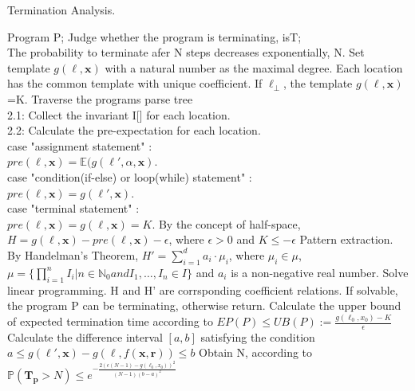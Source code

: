 \documentclass[sigconf,review, anonymous]{acmart}
\begin{document}
\begin{algorithm}[htb]  
	\caption{Termination Analysis.}  
	\label{TA}  
	\begin{algorithmic}[1]  
		\REQUIRE 
		Program P; 
		\ENSURE  
		Judge whether the program is terminating, isT;\\
		The probability to terminate afer N steps decreases exponentially, N.
		\STATE Set template $g(\ell,\boldsymbol{x})$ with a natural number as the maximal degree. Each location has the common template with unique coefficient. If $\ell_{\bot}$, the template $g(\ell,\boldsymbol{x})$=K.
		\STATE Traverse the programs parse tree \\
		2.1: Collect the invariant I[] for each location.\\
		2.2: Calculate the pre-expectation for each location.\\
		\quad \quad case "assignment statement" :\\
		\quad \quad \quad \quad $pre(\ell,\boldsymbol{x})= \mathbb{E}(g(\ell',\alpha,\boldsymbol{x})$.\\
		\quad \quad case "condition(if-else) or loop(while) statement" :\\
		\quad \quad \quad \quad $pre(\ell,\boldsymbol{x})=g(\ell',\boldsymbol{x})$.\\
		\quad \quad case "terminal statement" :\\
		\quad \quad \quad \quad $pre(\ell,\boldsymbol{x})=g(\ell,\boldsymbol{x})=K$.
		\STATE By the concept of half-space, $H=g(\ell,\boldsymbol{x})-pre(\ell,\boldsymbol{x})-\epsilon$, where $\epsilon >0$ and $K \leq -\epsilon$
		\STATE Pattern extraction. By Handelman's Theorem, $H'=\sum\limits_{i=1}^{d} a_i\cdot \mu_i$, where $\mu_i \in \mu$, $\mu=\{\prod\limits_{i=1}^{n} I_i | n\in\mathbb{N}_0 and I_1,\dots,I_n \in I\}$ and $a_i$ is a non-negative real number.
		\STATE Solve linear programming. H and H' are corrsponding coefficient relations. If solvable, the program P can be terminating, otherwise return.
		\STATE Calculate the upper bound of expected termination time according to $EP(P)\leq UB(P):=\frac{g(\ell_0,x_0)-K}{\epsilon}$
		\STATE Calculate the difference interval $[a,b]$ satisfying the condition $a\leq g(\ell',\boldsymbol{x})-g(\ell,f(\boldsymbol{x},\boldsymbol{r}))\leq b$
		\STATE Obtain N, according to $\mathbb{P}(\bm{T_p} > N) \leq e^{-\frac{2(\epsilon(N-1)-g(\ell_0,x_0))^2}{(N-1)(b-a)^2}}$
	\end{algorithmic}  
\end{algorithm}  
\end{document}
